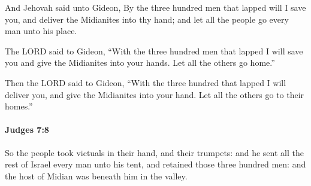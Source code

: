 			\begin{versebox}
					\item[BHS] 
					\item[ASV] And Jehovah said unto Gideon, By the three hundred men that lapped will I save you, and deliver the Midianites into thy hand; and let all the people go every man unto his place.
					\item[NIV] The LORD said to Gideon, “With the three hundred men that lapped I will save you and give the Midianites into your hands. Let all the others go home.”
					\item[NRSV] Then the LORD said to Gideon, “With the three hundred that lapped I will deliver you, and give the Midianites into your hand. Let all the others go to their homes.”
			\end{versebox}

		\paragraph{Judges 7:8} %
			\label{JUDGES-7-8}

			So the people took victuals in their hand, and their trumpets: and he sent all the rest of Israel every man unto his tent, and retained those three hundred men: and the host of Midian was beneath him in the valley.

